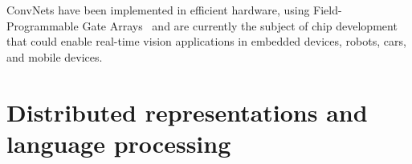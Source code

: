 \documentclass[10pts]{article}
\begin{document}

ConvNets have been implemented in efficient hardware, using
Field-Programmable Gate Arrays~\citep{farabet-suml-11} and are
currently the subject of chip development that
could enable real-time vision applications in embedded devices,
robots, cars, and mobile devices.



\section{Distributed representations and language processing}
\end{document}
